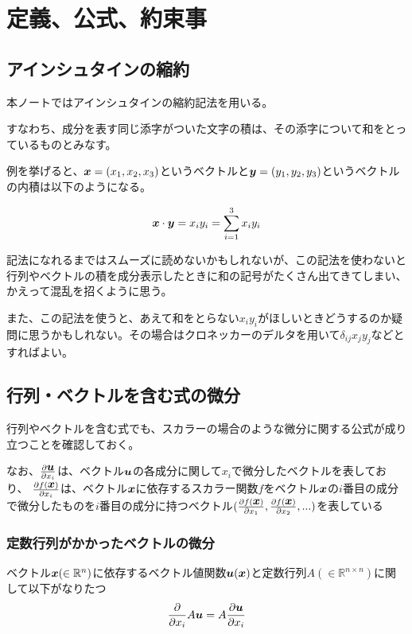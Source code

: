 \documentclass{jarticle}
\def\vec#1{\mbox{\boldmath $#1$}}
\begin{document}
 
\setcounter{section}{-1}
\section{定義、公式、約束事}
\subsection{アインシュタインの縮約}
本ノートではアインシュタインの縮約記法を用いる。

すなわち、成分を表す同じ添字がついた文字の積は、その添字について和をとっているものとみなす。

例を挙げると、$\vec{x}=(x_1, x_2,x_3)$というベクトルと$\vec{y}=(y_1,y_2,y_3)$というベクトルの内積は以下のようになる。

\begin{eqnarray}
\vec{x} \cdot \vec{y} = x_i y_i = \sum _{i=1} ^3 x_i y_i
\end{eqnarray}

記法になれるまではスムーズに読めないかもしれないが、この記法を使わないと行列やベクトルの積を成分表示したときに和の記号がたくさん出てきてしまい、かえって混乱を招くように思う。

また、この記法を使うと、あえて和をとらない$ x_i y_i $がほしいときどうするのか疑問に思うかもしれない。その場合はクロネッカーのデルタを用いて$  \delta _{ij} x_j y_j$などとすればよい。

\subsection{行列・ベクトルを含む式の微分}
行列やベクトルを含む式でも、スカラーの場合のような微分に関する公式が成り立つことを確認しておく。

なお、$  \frac{\partial \vec{u}}{\partial x_i}$は、ベクトル$\vec{u}$の各成分に関して$x_i$で微分したベクトルを表しており、
$ \frac{\partial f(\vec{x})}{\partial x_i}$は、ベクトル$\vec{x}$に依存するスカラー関数$f$をベクトル$\vec{x}$の$i$番目の成分で微分したものを$i$番目の成分に持つベクトル$( \frac{\partial f(\vec{x})}{\partial x_1}, \frac{\partial f(\vec{x})}{\partial x_2},...)$を表している


\subsubsection{定数行列がかかったベクトルの微分}
ベクトル$\vec{x} (\in \mathbb{R}^n)$に依存するベクトル値関数$\vec{u}(\vec{x})$と定数行列$A (\in \mathbb{R}^{n\times n})$に関して以下がなりたつ
\begin{eqnarray}
\frac{\partial}{\partial x_i} A \vec{u} =A \frac{\partial  \vec{u} }{\partial x_i}
\end{eqnarray}
\end{document}
